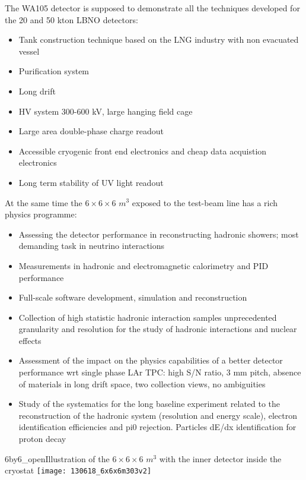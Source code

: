 The WA105 detector is supposed to demonstrate all the techniques developed for the 20 and 50 kton LBNO detectors:

\begin{itemize}
\item{Tank construction technique based on the LNG industry with non evacuated vessel}
\item{Purification system}
\item{Long drift}
\item{HV system 300-600 kV, large hanging field cage}
\item{Large area double-phase charge readout}
\item{Accessible cryogenic front end electronics and cheap data acquistion electronics}
\item{Long term stability of UV light readout}
\end{itemize}

At the same time the $6\times 6\times 6$ $m^3$ exposed to the test-beam line has a rich physics programme:

\begin{itemize}
\item{Assessing the detector performance in reconstructing hadronic showers; most demanding task in neutrino interactions}
\item{ Measurements in hadronic and electromagnetic calorimetry and PID performance}
\item{Full-scale software development, simulation and reconstruction}
\item{Collection of high statistic hadronic interaction samples  unprecedented granularity and resolution for the study of hadronic interactions and nuclear effects}
\item{Assessment of the impact on the physics capabilities of a better detector performance wrt  single phase LAr TPC: high S/N ratio, 3 mm pitch, absence of materials in long drift space, two collection views, no ambiguities}
\item{Study of the systematics for the long baseline experiment related to the reconstruction of the hadronic system (resolution and energy scale), electron identification efficiencies and pi0 rejection. Particles dE/dx identification for proton decay}
\end{itemize}


\begin{cdrfigure}{6by6_open}{Illustration of the  $6\times 6\times 6$ $m^3$  with the inner detector inside the cryostat}
\texttt{[image: 130618\_6x6x6m303v2]}
\end{cdrfigure}

